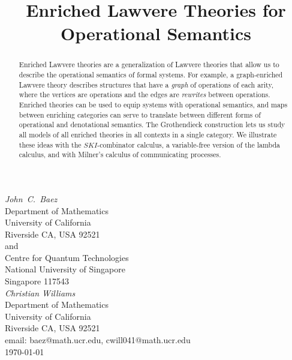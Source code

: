 \documentclass{amsart}
\theoremstyle{definition}
\begin{document}
\title{Enriched Lawvere Theories 
for Operational Semantics \\}

\maketitle
\begin{center}   
  {\em John\ C.\ Baez \\}
  \vspace{0.3cm}
  {\small
 Department of Mathematics \\
    University of California \\
  Riverside CA, USA 92521 \\ and \\
 Centre for Quantum Technologies  \\
    National University of Singapore \\
    Singapore 117543  \\    } 
  \vspace{0.4cm}
{\em Christian Williams \\}
\vspace{0.3cm}
   {\small
   Department of Mathematics \\
  University of California \\
  Riverside CA, USA 92521 \\}
  \vspace{0.3cm}   
  {\small email:  baez@math.ucr.edu, cwill041@math.ucr.edu\\} 
  \vspace{0.3cm}   
  {\small \today}
  \vspace{0.3cm}   
\end{center} 

\begin{abstract} 
Enriched Lawvere theories are a generalization of Lawvere theories that allow us to describe the operational semantics of formal systems.  For example, a graph-enriched Lawvere theory describes structures that have a \emph{graph} of operations of each arity, where the vertices are operations and the edges are \emph{rewrites} between operations. Enriched theories can be used to equip systems with operational semantics, and maps between enriching categories can serve to translate between different forms of operational and denotational semantics.  The Grothendieck construction lets us study all models of all enriched theories in all contexts in a single category.  We illustrate these ideas with the $SKI$-combinator calculus, a variable-free version of the lambda calculus, and with Milner's calculus of communicating processes.
\end{abstract}
\end{document}
